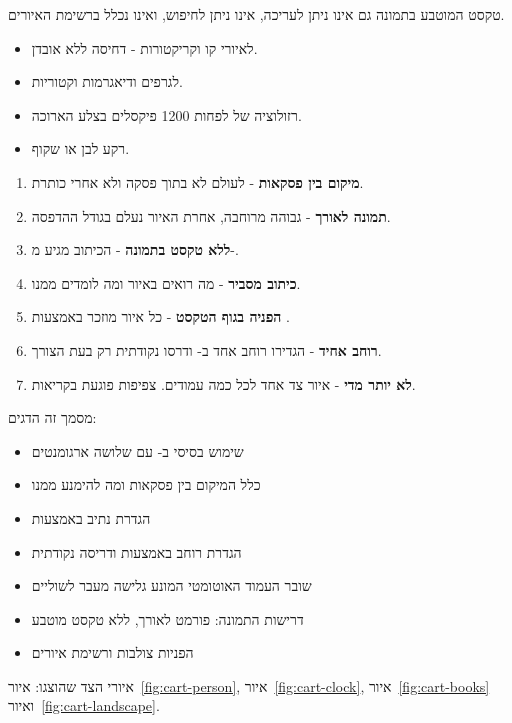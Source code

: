 \documentclass{hebrew-academic-template}
\begin{document}
טקסט המוטבע בתמונה גם אינו ניתן לעריכה, אינו ניתן לחיפוש, ואינו נכלל ברשימת
האיורים.


\begin{itemize}
    \item \textbf{} לאיורי קו וקריקטורות - דחיסה ללא אובדן.
    \item \textbf{} לגרפים ודיאגרמות וקטוריות.
    \item רזולוציה של לפחות \num{1200} פיקסלים בצלע הארוכה.
    \item רקע לבן או שקוף.
\end{itemize}



\begin{enumerate}
    \item \textbf{מיקום בין פסקאות} - לעולם לא בתוך פסקה ולא אחרי כותרת.
    \item \textbf{תמונה לאורך} - גבוהה מרוחבה, אחרת האיור נעלם בגודל ההדפסה.
    \item \textbf{ללא טקסט בתמונה} - הכיתוב מגיע מ-.
    \item \textbf{כיתוב מסביר} - מה רואים באיור ומה לומדים ממנו.
    \item \textbf{הפניה בגוף הטקסט} - כל איור מוזכר באמצעות .
    \item \textbf{רוחב אחיד} - הגדירו רוחב אחד ב-
          ודרסו נקודתית רק בעת הצורך.
    \item \textbf{לא יותר מדי} - איור צד אחד לכל כמה עמודים. צפיפות פוגעת בקריאות.
\end{enumerate}



מסמך זה הדגים:

\begin{itemize}
    \item שימוש בסיסי ב- עם שלושה ארגומנטים
    \item כלל המיקום בין פסקאות ומה להימנע ממנו
    \item הגדרת נתיב באמצעות 
    \item הגדרת רוחב באמצעות  ודריסה נקודתית
    \item שובר העמוד האוטומטי המונע גלישה מעבר לשוליים
    \item דרישות התמונה: פורמט לאורך, ללא טקסט מוטבע
    \item הפניות צולבות ורשימת איורים
\end{itemize}

איורי הצד שהוצגו: איור~\ref{fig:cart-person}, איור~\ref{fig:cart-clock},
איור~\ref{fig:cart-books} ואיור~\ref{fig:cart-landscape}.
\end{document}
